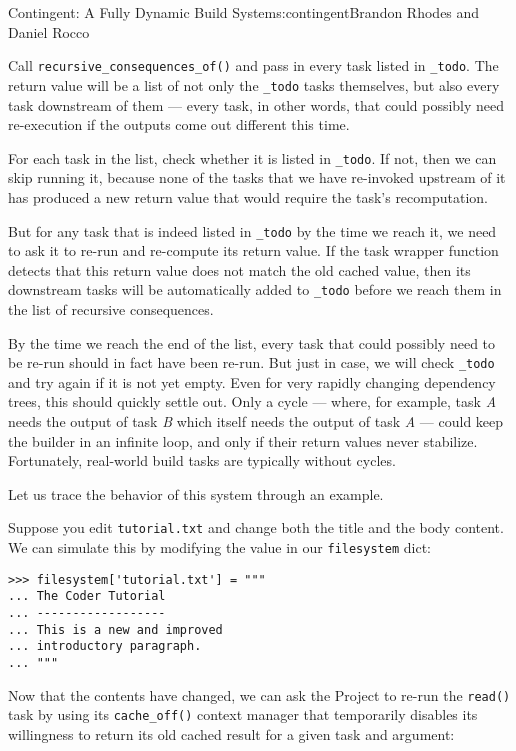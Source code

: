\begin{aosachapter}{Contingent: A Fully Dynamic Build System}{s:contingent}{Brandon Rhodes and Daniel Rocco}
\begin{aosaitemize}
\item
  Call \texttt{recursive\_consequences\_of()} and pass in every task
  listed in \texttt{\_todo}. The return value will be a list of not only
  the \texttt{\_todo} tasks themselves, but also every task downstream
  of them --- every task, in other words, that could possibly need
  re-execution if the outputs come out different this time.
\item
  For each task in the list, check whether it is listed in
  \texttt{\_todo}. If not, then we can skip running it, because none of
  the tasks that we have re-invoked upstream of it has produced a new
  return value that would require the task's recomputation.
\item
  But for any task that is indeed listed in \texttt{\_todo} by the time
  we reach it, we need to ask it to re-run and re-compute its return
  value. If the task wrapper function detects that this return value
  does not match the old cached value, then its downstream tasks will be
  automatically added to \texttt{\_todo} before we reach them in the
  list of recursive consequences.
\end{aosaitemize}

By the time we reach the end of the list, every task that could possibly
need to be re-run should in fact have been re-run. But just in case, we
will check \texttt{\_todo} and try again if it is not yet empty. Even
for very rapidly changing dependency trees, this should quickly settle
out. Only a cycle --- where, for example, task \emph{A} needs the output
of task \emph{B} which itself needs the output of task \emph{A} ---
could keep the builder in an infinite loop, and only if their return
values never stabilize. Fortunately, real-world build tasks are
typically without cycles.

Let us trace the behavior of this system through an example.

Suppose you edit \texttt{tutorial.txt} and change both the title and the
body content. We can simulate this by modifying the value in our
\texttt{filesystem} dict:

\begin{verbatim}
>>> filesystem['tutorial.txt'] = """
... The Coder Tutorial
... ------------------
... This is a new and improved
... introductory paragraph.
... """
\end{verbatim}

Now that the contents have changed, we can ask the Project to re-run the
\texttt{read()} task by using its \texttt{cache\_off()} context manager
that temporarily disables its willingness to return its old cached
result for a given task and argument:


\end{aosachapter}
